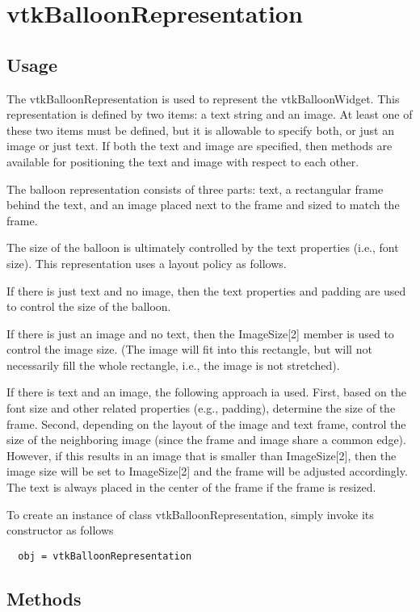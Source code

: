 \section{vtkBalloonRepresentation}

\subsection{Usage}

 The vtkBalloonRepresentation is used to represent the vtkBalloonWidget.
 This representation is defined by two items: a text string and an image.
 At least one of these two items must be defined, but it is allowable to
 specify both, or just an image or just text. If both the text and image
 are specified, then methods are available for positioning the text and
 image with respect to each other.

 The balloon representation consists of three parts: text, a rectangular
 frame behind the text, and an image placed next to the frame and sized
 to match the frame.

 The size of the balloon is ultimately controlled by the text properties
 (i.e., font size). This representation uses a layout policy as follows.
 
 If there is just text and no image, then the text properties and padding
 are used to control the size of the balloon.

 If there is just an image and no text, then the ImageSize[2] member is
 used to control the image size. (The image will fit into this rectangle,
 but will not necessarily fill the whole rectangle, i.e., the image is not
 stretched).

 If there is text and an image, the following approach ia used. First,
 based on the font size and other related properties (e.g., padding),
 determine the size of the frame. Second, depending on the layout of the
 image and text frame, control the size of the neighboring image (since the
 frame and image share a common edge). However, if this results in an image
 that is smaller than ImageSize[2], then the image size will be set to
 ImageSize[2] and the frame will be adjusted accordingly. The text is
 always placed in the center of the frame if the frame is resized.

To create an instance of class vtkBalloonRepresentation, simply
invoke its constructor as follows
\begin{verbatim}
  obj = vtkBalloonRepresentation
\end{verbatim}
\subsection{Methods}

